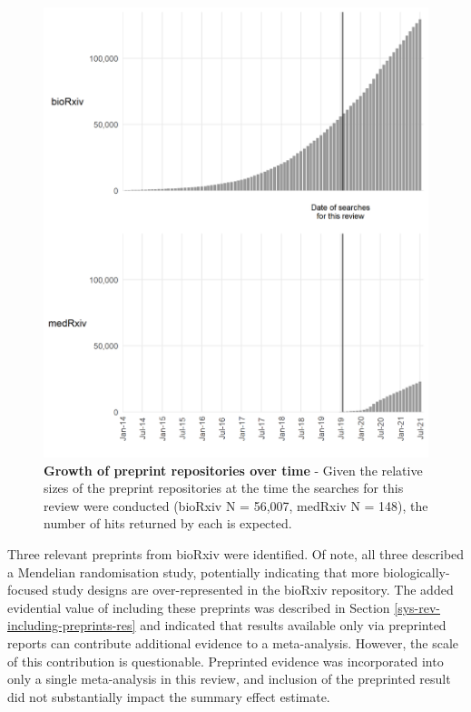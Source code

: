 \documentclass[a4paper, twoside]{templates/ociamthesis}
\begin{document}
\begin{figure}[H]

{\centering \includegraphics[width=0.8\linewidth]{figures/sys-rev/preprint_growth} 

}

\caption[Growth of preprint repositories over time]{\textbf{Growth of preprint repositories over time} - Given the relative sizes of the preprint repositories at the time the searches for this review were conducted (bioRxiv N = 56,007, medRxiv N = 148), the number of hits returned by each is expected.}\label{fig:preprintGrowth}
\end{figure}

Three relevant preprints from bioRxiv were identified. Of note, all three described a Mendelian randomisation study, potentially indicating that more biologically-focused study designs are over-represented in the bioRxiv repository. The added evidential value of including these preprints was described in Section \ref{sys-rev-including-preprints-res} and indicated that results available only via preprinted reports can contribute additional evidence to a meta-analysis. However, the scale of this contribution is questionable. Preprinted evidence was incorporated into only a single meta-analysis in this review, and inclusion of the preprinted result did not substantially impact the summary effect estimate.
\end{document}
